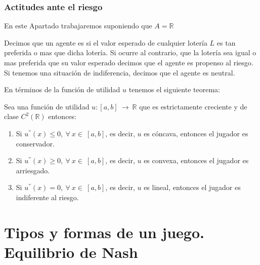 \documentclass[12pt,a4paper,]{book}
\def\ifdoblecara{} %
\def\ifprincipal{} %
\numberwithin{dummy}{section}
\theoremstyle{ocrenumbox}
\theoremstyle{blacknumex}
\theoremstyle{blacknumbox}
\theoremstyle{ocrenum}
\theoremstyle{ocrenum}
\begin{document}
\hypertarget{Seccion141}{%
\subsection{Actitudes ante el riesgo}\label{Seccion141}}

En este Apartado trabajaremos suponiendo que \(A=\mathbb{R}\)

Decimos que un agente es si el valor esperado de cualquier lotería \(L\)
es tan preferida o mas que dicha lotería. Si ocurre al contrario, que la
lotería sea igual o mas preferida que su valor esperado decimos que el
agente es propenso al riesgo. Si tenemos una situación de indiferencia,
decimos que el agente es neutral.

En términos de la función de utilidad \(u\) tenemos el siguiente
teorema:

Sea una función de utilidad \(u: [a,b] \ \rightarrow \ \mathbb{R}\) que
es estrictamente creciente y de clase \(C^2(\mathbb{R})\) entonces:

\begin{enumerate}
\def\labelenumi{\arabic{enumi}.}
\item
  Si \(u^{''}(x) \leq 0, \ \forall \ x \in \ [a,b]\), es decir, \(u\) es
  cóncava, entonces el jugador es conservador.
\item
  Si \(u^{''}(x) \geq 0, \ \forall \ x \in \ [a,b]\), es decir, \(u\) es
  convexa, entonces el jugador es arriesgado.
\item
  Si \(u^{''}(x) = 0, \ \forall \ x \in \ [a,b]\), es decir, \(u\) es
  lineal, entonces el jugador es indiferente al riesgo.
\end{enumerate}

\FloatBarrier

\ifdefined\ifprincipal
\else
\setlength{\parindent}{1em}
\pagestyle{fancy}
\setcounter{tocdepth}{4}
\tableofcontents

\fi

\ifdefined\ifdoblecara
\fancyhead{}{}
\fancyhead[LE,RO]{\scriptsize\rightmark}
\fancyfoot[LO,RE]{\scriptsize\slshape \leftmark}
\fancyfoot[C]{}
\fancyfoot[LE,RO]{\footnotesize\thepage}
\else
\fancyhead{}{}
\fancyhead[RO]{\scriptsize\rightmark}
\fancyfoot[LO]{\scriptsize\slshape \leftmark}
\fancyfoot[C]{}
\fancyfoot[RO]{\footnotesize\thepage}
\fi

\renewcommand{\headrulewidth}{0.4pt}
\renewcommand{\footrulewidth}{0.4pt}

\hypertarget{Seccion2}{%
\chapter{Tipos y formas de un juego. Equilibrio de
Nash}\label{Seccion2}}
\end{document}
